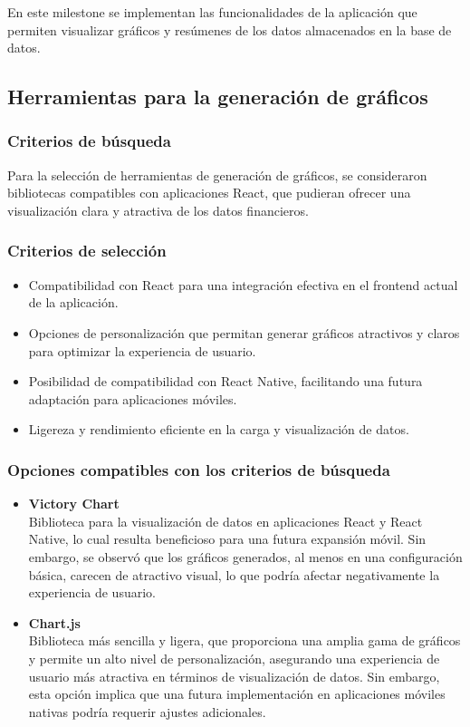En este milestone se implementan las funcionalidades de la aplicación que permiten visualizar gráficos y resúmenes de los datos almacenados en la base de datos.
\subsection{Herramientas para la generación de gráficos}
\subsubsection{Criterios de búsqueda}
Para la selección de herramientas de generación de gráficos, se consideraron bibliotecas compatibles con aplicaciones React, que pudieran ofrecer una visualización clara y atractiva de los datos financieros. 

\subsubsection{Criterios de selección}
\begin{itemize}
    \item Compatibilidad con React para una integración efectiva en el frontend actual de la aplicación.
    \item Opciones de personalización que permitan generar gráficos atractivos y claros para optimizar la experiencia de usuario.
    \item Posibilidad de compatibilidad con React Native, facilitando una futura adaptación para aplicaciones móviles.
    \item Ligereza y rendimiento eficiente en la carga y visualización de datos.
\end{itemize}

\subsubsection{Opciones compatibles con los criterios de búsqueda}
\begin{itemize}
    \item \textbf{Victory Chart}\\
    Biblioteca para la visualización de datos en aplicaciones React y React Native, lo cual resulta beneficioso para una futura expansión móvil. Sin embargo, se observó que los gráficos generados, al menos en una configuración básica, carecen de atractivo visual, lo que podría afectar negativamente la experiencia de usuario.
    
    \item \textbf{Chart.js}\\
    Biblioteca más sencilla y ligera, que proporciona una amplia gama de gráficos y permite un alto nivel de personalización, asegurando una experiencia de usuario más atractiva en términos de visualización de datos. Sin embargo, esta opción implica que una futura implementación en aplicaciones móviles nativas podría requerir ajustes adicionales.
\end{itemize}

